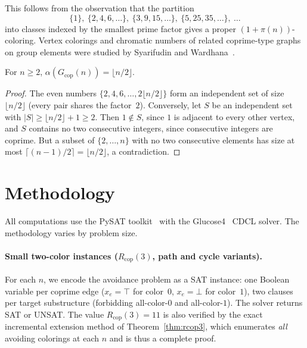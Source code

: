 \documentclass[12pt]{article}
\newcommand{\Rcop}{R_{\mathrm{cop}}}
\newcommand{\Gcop}{G_{\mathrm{cop}}}
\begin{document}
This follows from the observation that the partition
\[
  \{1\},\ \{2,4,6,\ldots\},\ \{3,9,15,\ldots\},\ \{5,25,35,\ldots\},\ \ldots
\]
into classes indexed by the smallest prime factor gives a proper
$(1+\pi(n))$-coloring. Vertex colorings and chromatic numbers of
related coprime-type graphs on group elements were studied by
Syarifudin and Wardhana~\cite{syarifudin2021}.

\begin{proposition}\label{prop:independence}
For $n \ge 2$, $\alpha(\Gcop(n))=\lfloor n/2\rfloor$.
\end{proposition}

\begin{proof}
The even numbers $\{2,4,6,\ldots,2\lfloor n/2\rfloor\}$ form an
independent set of size $\lfloor n/2\rfloor$ (every pair shares the
factor~$2$). Conversely, let $S$ be an independent set with
$|S| \ge \lfloor n/2\rfloor+1 \ge 2$. Then $1 \notin S$, since $1$ is
adjacent to every other vertex, and $S$ contains no two consecutive
integers, since consecutive integers are coprime. But a subset of
$\{2,\ldots,n\}$ with no two consecutive elements has size at most
$\lceil (n-1)/2 \rceil = \lfloor n/2 \rfloor$, a contradiction.
\end{proof}


\section{Methodology}\label{sec:method}

All computations use the PySAT toolkit~\cite{pysat} with the
Glucose4~\cite{glucose} CDCL solver. The methodology varies by problem
size.

\paragraph{Small two-color instances ($\Rcop(3)$, path and cycle variants).}
For each $n$, we encode the avoidance problem as a SAT instance: one
Boolean variable per coprime edge ($x_e=\top$ for color~$0$, $x_e=\bot$
for color~$1$), two clauses per target substructure (forbidding
all-color-$0$ and all-color-$1$). The solver returns SAT or UNSAT. The
value $\Rcop(3)=11$ is also verified by the exact incremental extension
method of Theorem~\ref{thm:rcop3}, which enumerates \emph{all} avoiding
colorings at each $n$ and is thus a complete proof.
\end{document}
